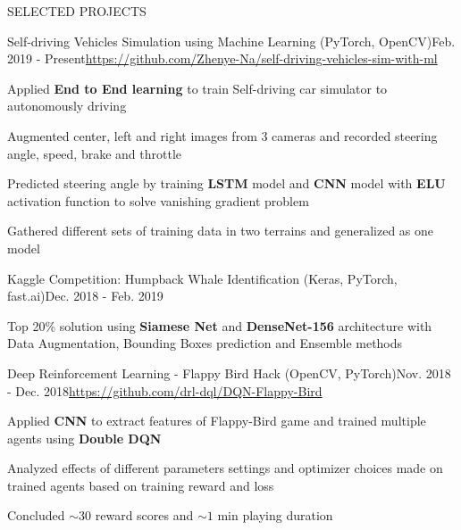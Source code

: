 \documentclass{resume} %
\begin{document}

\begin{rSection}{SELECTED PROJECTS}

\begin{rSubsection}{Self-driving Vehicles Simulation using Machine Learning (PyTorch, OpenCV)}{Feb. 2019 - Present}{\url{https://github.com/Zhenye-Na/self-driving-vehicles-sim-with-ml}}{}
\item Applied \textbf{End to End learning} to train Self-driving car simulator to autonomously driving
\item Augmented center, left and right images from 3 cameras and recorded steering angle, speed, brake and throttle
\item Predicted steering angle by training \textbf{LSTM} model and \textbf{CNN} model with \textbf{ELU} activation function to solve vanishing gradient problem
\item Gathered different sets of training data in  two terrains and generalized as one model
\end{rSubsection}


\begin{rSubsection}{Kaggle Competition: Humpback Whale Identification (Keras, PyTorch, fast.ai)}{Dec. 2018 - Feb. 2019}{}{}
\item Top 20\% solution using \textbf{Siamese Net} and \textbf{DenseNet-156} architecture with Data Augmentation, Bounding Boxes prediction and Ensemble methods
\end{rSubsection}


\begin{rSubsection}{Deep Reinforcement Learning - Flappy Bird Hack (OpenCV, PyTorch)}{Nov. 2018 - Dec. 2018}{\url{https://github.com/drl-dql/DQN-Flappy-Bird}}{}
\item Applied \textbf{CNN} to extract features of Flappy-Bird game and trained multiple agents using \textbf{Double DQN}
\item Analyzed effects of different parameters settings and optimizer choices made on trained agents based on training reward and loss
\item Concluded $\sim 30$ reward scores and  $\sim 1$ min playing duration
\end{rSubsection}



\end{rSection}
\end{document}
